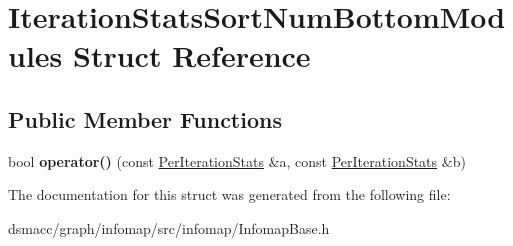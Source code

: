 \hypertarget{structIterationStatsSortNumBottomModules}{}\section{Iteration\+Stats\+Sort\+Num\+Bottom\+Modules Struct Reference}
\label{structIterationStatsSortNumBottomModules}
\subsection*{Public Member Functions}
\begin{DoxyCompactItemize}
\item 
\mbox{\label{structIterationStatsSortNumBottomModules_ac3938491d57005242e9434802c7b67c3}} 
bool {\bfseries operator()} (const \mbox{\hyperlink{structPerIterationStats}{Per\+Iteration\+Stats}} \&a, const \mbox{\hyperlink{structPerIterationStats}{Per\+Iteration\+Stats}} \&b)
\end{DoxyCompactItemize}


The documentation for this struct was generated from the following file\+:\begin{DoxyCompactItemize}
\item 
dsmacc/graph/infomap/src/infomap/Infomap\+Base.\+h\end{DoxyCompactItemize}
